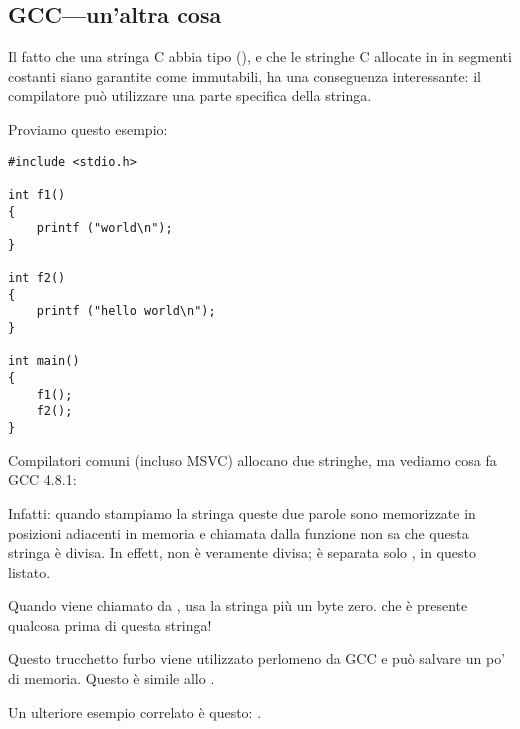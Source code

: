 \subsection{GCC---un'altra cosa}
\label{use_parts_of_C_strings}

Il fatto che una stringa C  abbia tipo  (),
e che le stringhe C allocate in in segmenti costanti siano garantite come immutabili, ha una conseguenza interessante:
il compilatore può utilizzare una parte specifica della stringa.

Proviamo questo esempio:

\begin{lstlisting}[style=customc]
#include <stdio.h>

int f1()
{
	printf ("world\n");
}

int f2()
{
	printf ("hello world\n");
}

int main()
{
	f1();
	f2();
}
\end{lstlisting}

Compilatori \CCpp{} comuni (incluso MSVC) allocano due stringhe, ma vediamo cosa fa GCC 4.8.1:



Infatti: quando stampiamo la stringa 
queste due parole sono memorizzate in posizioni adiacenti in memoria e \puts chiamata dalla funzione 
non sa che questa stringa è divisa.
In effett, non è veramente divisa; è separata solo , in questo listato.

Quando \puts viene chiamato da , usa la stringa  più un byte zero. \puts che è presente qualcosa prima di questa stringa!

Questo trucchetto furbo viene utilizzato perlomeno da GCC e può salvare un po' di memoria.
Questo è simile allo .

Un ulteriore esempio correlato è questo: .
